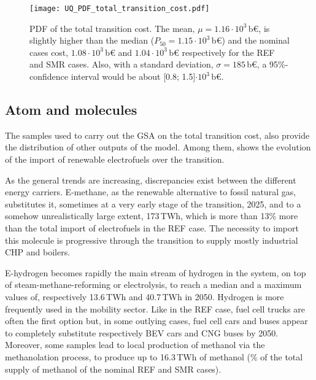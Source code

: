 \begin{figure}[htbp!]
\centering
\texttt{[image: UQ\_PDF\_total\_transition\_cost.pdf]}
\caption{\acrfull{PDF} of the total transition cost. The mean, $\mu=1.16\cdot10^3$\,b€, is slightly higher than the median ($P_{50}=1.15\cdot10^3$\,b€) and the nominal cases cost, $1.08\cdot10^3$\,b€ and $1.04\cdot10^3$\,b€ respectively for the REF and SMR cases. Also, with a standard deviation, $\sigma=185$\,b€, a 95\%-confidence interval would be about [0.8; 1.5]$\cdot10^3$\,b€.}
\label{fig:UQ_PDF_total_transition_cost}
\end{figure}

\subsection{Atom and molecules}
\label{subsec:atom_mol:results_atom_mol}
The samples used to carry out the \gls{GSA} on the total transition cost, also provide the distribution of other outputs of the model. Among them,  shows the evolution of the import of renewable electrofuels over the transition.

As the general trends are increasing, discrepancies exist between the different energy carriers. E-methane, as the renewable alternative to fossil natural gas, substitutes it, sometimes at a very early stage of the transition, 2025, and to a somehow unrealistically large extent, 173\,TWh, which is more than 13\% more than the total import of electrofuels in the REF case. The necessity to import this molecule is progressive through the transition to supply mostly industrial \gls{CHP} and boilers. 

E-hydrogen becomes rapidly the main stream of hydrogen in the system, on top of steam-methane-reforming or electrolysis, to reach a median and a maximum values of, respectively 13.6\,TWh and 40.7\,TWh in 2050. Hydrogen is more frequently used in the mobility sector. Like in the REF case, fuel cell trucks are often the first option but, in some outlying cases, fuel cell cars and buses appear to completely substitute respectively \gls{BEV} cars and \gls{CNG} buses by 2050. Moreover, some samples lead to local production of methanol via the methanolation process, to produce up to 16.3\,TWh of methanol (\% of the total supply of methanol of the nominal REF and SMR cases). 

